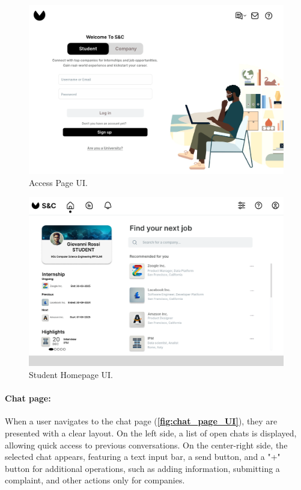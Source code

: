 \newpage

\begin{figure}[H]
    \begin{center}
        \includegraphics[width=0.9\linewidth]{Images/UserInterfaces/AccessPage.pdf}
        \caption{Access Page UI.}
        \label{fig:access_page_UI}%
    \end{center}
\end{figure}

\begin{figure}[H]
    \begin{center}
        \includegraphics[width=0.9\linewidth]{Images/UserInterfaces/SHomepage.pdf}
        \caption{Student Homepage UI.}        
        \label{fig:student_homepage_UI}%
    \end{center}
\end{figure}

\newpage

\paragraph{Chat page:} When a user navigates to the chat page (\textbf{\autoref{fig:chat_page_UI}}), they are presented with a clear layout. On the left side, a list of open chats is displayed, allowing quick access to previous conversations. On the center-right side, the selected chat appears, featuring a text input bar, a send button, and a "+" button for additional operations, such as adding information, submitting a complaint, and other actions only for companies.


